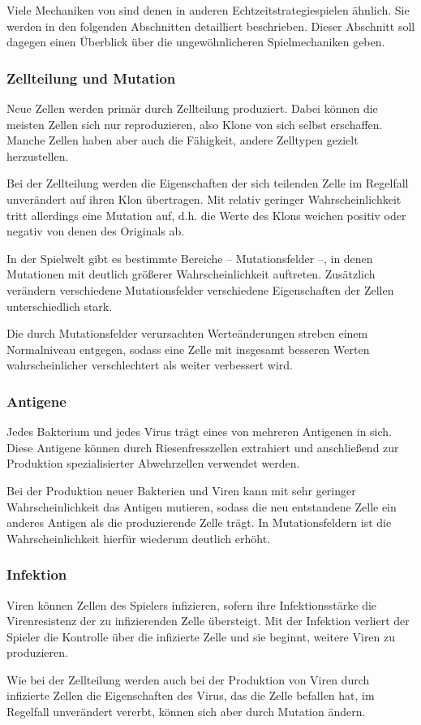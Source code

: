 Viele Mechaniken von \name{} sind denen in anderen Echtzeitstrategiespielen
ähnlich. Sie werden in den folgenden Abschnitten detailliert beschrieben. Dieser
Abschnitt soll dagegen einen Überblick über die ungewöhnlicheren Spielmechaniken
geben.

\subsubsection{Zellteilung und Mutation}

Neue Zellen werden primär durch Zellteilung produziert. Dabei können die
meisten Zellen sich nur reproduzieren, also Klone von sich selbst erschaffen.
Manche Zellen haben aber auch die Fähigkeit, andere Zelltypen gezielt
herzustellen.

Bei der Zellteilung werden die Eigenschaften der sich teilenden Zelle im
Regelfall unverändert auf ihren Klon übertragen. Mit relativ geringer
Wahrscheinlichkeit tritt allerdings eine Mutation auf, d.h. die Werte des
Klons weichen positiv oder negativ von denen des Originals ab.

In der Spielwelt gibt es bestimmte Bereiche -- Mutationsfelder --, in denen
Mutationen mit deutlich größerer Wahrscheinlichkeit auftreten. Zusätzlich
verändern verschiedene Mutationsfelder verschiedene Eigenschaften der Zellen
unterschiedlich stark.

Die durch Mutationsfelder verursachten Werteänderungen streben einem
Normalniveau entgegen, sodass eine Zelle mit insgesamt besseren Werten
wahrscheinlicher verschlechtert als weiter verbessert wird.

\subsubsection{Antigene}

Jedes Bakterium und jedes Virus trägt eines von mehreren Antigenen in sich.
Diese Antigene können durch Riesenfresszellen extrahiert und anschließend
zur Produktion spezialisierter Abwehrzellen verwendet werden.

Bei der Produktion neuer Bakterien und Viren kann mit sehr geringer
Wahrscheinlichkeit das Antigen mutieren, sodass die neu entstandene Zelle
ein anderes Antigen als die produzierende Zelle trägt. In Mutationsfeldern
ist die Wahrscheinlichkeit hierfür wiederum deutlich erhöht.

\subsubsection{Infektion}

Viren können Zellen des Spielers infizieren, sofern ihre Infektionsstärke die
Virenresistenz der zu infizierenden Zelle übersteigt. Mit der Infektion
verliert der Spieler die Kontrolle über die infizierte Zelle und sie beginnt,
weitere Viren zu produzieren.

Wie bei der Zellteilung werden auch bei der Produktion von Viren durch
infizierte Zellen die Eigenschaften des Virus, das die Zelle befallen hat,
im Regelfall unverändert vererbt, können sich aber durch Mutation ändern.
